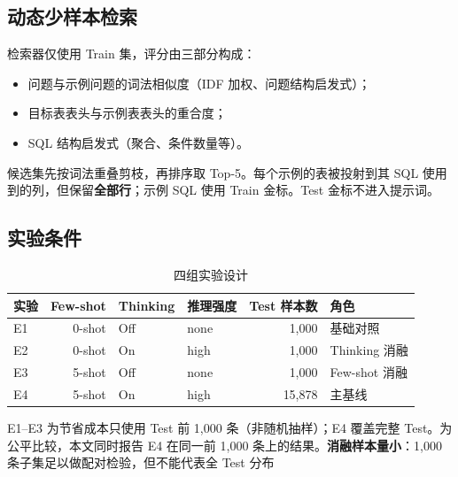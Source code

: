 \documentclass[conference]{IEEEtran}
\begin{document}
\subsection{动态少样本检索}
检索器仅使用 Train 集，评分由三部分构成：
\begin{itemize}
\item 问题与示例问题的词法相似度（IDF 加权、问题结构启发式）；
\item 目标表表头与示例表表头的重合度；
\item SQL 结构启发式（聚合、条件数量等）。
\end{itemize}
候选集先按词法重叠剪枝，再排序取 Top-5。每个示例的表被投射到其 SQL 使用到的列，但保留\textbf{全部行}；示例 SQL 使用 Train 金标。Test 金标不进入提示词。
\subsection{实验条件}
\begin{table}[t]
\centering
\footnotesize
\caption{四组实验设计}
\label{tab:t4}
\begin{tabular}{@{}lrllrl@{}}
\toprule
实验 & Few-shot & Thinking & 推理强度 & Test 样本数 & 角色 \\
\midrule
E1 & 0-shot & Off & none & 1,000 & 基础对照 \\
E2 & 0-shot & On & high & 1,000 & Thinking 消融 \\
E3 & 5-shot & Off & none & 1,000 & Few-shot 消融 \\
E4 & 5-shot & On & high & 15,878 & 主基线 \\
\bottomrule
\end{tabular}
\end{table}
E1–E3 为节省成本只使用 Test 前 1,000 条（非随机抽样）；E4 覆盖完整 Test。为公平比较，本文同时报告 E4 在同一前 1,000 条上的结果。\textbf{消融样本量小}：1,000 条子集足以做配对检验，但不能代表全 Test 分布
\end{document}
